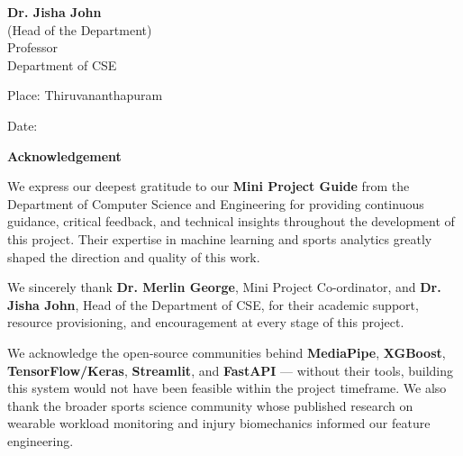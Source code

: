 \documentclass[12pt,a4paper]{report}
\begin{document}
\begin{singlespacing}
\hspace*{2in}
\parbox{2.5in}{
  \noindent \textbf{Dr. Jisha John} \\
  \noindent (Head of the Department)\\
  \noindent Professor\\
  \noindent Department of CSE\\
}
\end{singlespacing}
\begin{singlespacing}
\vspace{0.2in}
\hspace*{-0.25in}
\parbox{2.5in}{\noindent Place: Thiruvananthapuram\\}
\hspace*{1.5in}
\parbox{2.5in}{\noindent Date:\\}
\end{singlespacing}
\clearpage

\begin{center}
  {\Large \textbf{Acknowledgement}}\\[0.5cm]
\end{center}
\vspace*{0.5in}

We express our deepest gratitude to our \textbf{Mini Project Guide} from the Department of Computer Science and Engineering for providing continuous guidance, critical feedback, and technical insights throughout the development of this project. Their expertise in machine learning and sports analytics greatly shaped the direction and quality of this work.

\par
We sincerely thank \textbf{Dr. Merlin George}, Mini Project Co-ordinator, and \textbf{Dr. Jisha John}, Head of the Department of CSE, for their academic support, resource provisioning, and encouragement at every stage of this project.

\par
We acknowledge the open-source communities behind \textbf{MediaPipe}, \textbf{XGBoost}, \textbf{TensorFlow/Keras}, \textbf{Streamlit}, and \textbf{FastAPI} — without their tools, building this system would not have been feasible within the project timeframe. We also thank the broader sports science community whose published research on wearable workload monitoring and injury biomechanics informed our feature engineering.
\end{document}

